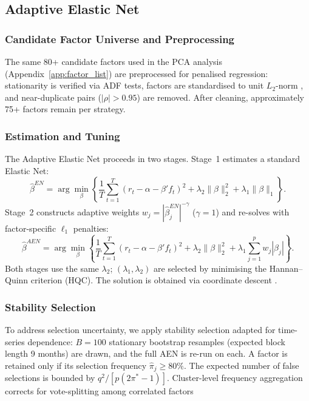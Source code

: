


\subsection{Adaptive Elastic Net}
\label{sec:aen}

\subsubsection{Candidate Factor Universe and Preprocessing}
\label{sec:aen_preproc}

The same 80+ candidate factors used in the PCA analysis
(Appendix~\ref{app:factor_list}) are preprocessed for penalised
regression: stationarity is verified via ADF tests, factors are
standardised to unit $L_2$-norm \citep{zou2009adaptive}, and
near-duplicate pairs ($|\rho| > 0.95$) are removed. After cleaning,
approximately 75+ factors remain per strategy.


\subsubsection{Estimation and Tuning}
\label{sec:aen_estimation}

The Adaptive Elastic Net \citep{zou2009adaptive} proceeds in two stages.
Stage~1 estimates a standard Elastic Net:
\[
\hat{\beta}^{EN} = \arg\min_{\beta}
\left\{
\frac{1}{T}\sum_{t=1}^{T}(r_t - \alpha - \beta'f_t)^2
+ \lambda_2\|\beta\|_2^2 + \lambda_1\|\beta\|_1
\right\}.
\]
Stage~2 constructs adaptive weights
$w_j = |\hat{\beta}^{EN}_j|^{-\gamma}$ ($\gamma=1$) and re-solves
with factor-specific $\ell_1$ penalties:
\[
\hat{\beta}^{AEN} = \arg\min_{\beta}
\left\{
\frac{1}{T}\sum_{t=1}^{T}(r_t - \alpha - \beta'f_t)^2
+ \lambda_2\|\beta\|_2^2
+ \lambda_1\sum_{j=1}^{p} w_j|\beta_j|
\right\}.
\]
Both stages use the same $\lambda_2$; $(\lambda_1, \lambda_2)$ are
selected by minimising the Hannan--Quinn criterion (HQC). The solution
is obtained via coordinate descent \citep{friedman2010regularization}.

\subsubsection{Stability Selection}
\label{sec:aen_stability}

To address selection uncertainty, we apply stability selection
\citep{meinshausen2010stability} adapted for time-series dependence:
$B=100$ stationary bootstrap resamples (expected block length 9 months)
are drawn, and the full AEN is re-run on each. A factor is retained
only if its selection frequency $\hat{\pi}_j \geq 80\%$. The expected
number of false selections is bounded by
$q^2 / [p(2\pi^* - 1)]$. Cluster-level frequency aggregation corrects
for vote-splitting among correlated factors

